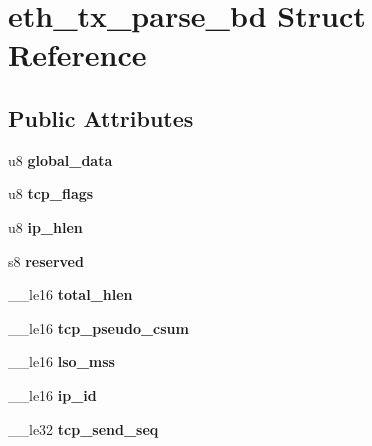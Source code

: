 \hypertarget{structeth__tx__parse__bd}{
\section{eth\_\-tx\_\-parse\_\-bd Struct Reference}
\label{structeth__tx__parse__bd}
}
\subsection*{Public Attributes}
\begin{DoxyCompactItemize}
\item 
\hypertarget{structeth__tx__parse__bd_a7b7f5aec557b3a6b45d133aa49247c58}{
u8 {\bfseries global\_\-data}}
\label{structeth__tx__parse__bd_a7b7f5aec557b3a6b45d133aa49247c58}

\item 
\hypertarget{structeth__tx__parse__bd_a49eeca34f84123dee757ce4af3e69185}{
u8 {\bfseries tcp\_\-flags}}
\label{structeth__tx__parse__bd_a49eeca34f84123dee757ce4af3e69185}

\item 
\hypertarget{structeth__tx__parse__bd_a1fdecb31e434f6a93b3314948f016467}{
u8 {\bfseries ip\_\-hlen}}
\label{structeth__tx__parse__bd_a1fdecb31e434f6a93b3314948f016467}

\item 
\hypertarget{structeth__tx__parse__bd_aa6d076ea08b403d8d1e6a0406af0a21e}{
s8 {\bfseries reserved}}
\label{structeth__tx__parse__bd_aa6d076ea08b403d8d1e6a0406af0a21e}

\item 
\hypertarget{structeth__tx__parse__bd_a98175b83474414440db4144e4e8891d8}{
\_\-\_\-le16 {\bfseries total\_\-hlen}}
\label{structeth__tx__parse__bd_a98175b83474414440db4144e4e8891d8}

\item 
\hypertarget{structeth__tx__parse__bd_a2c68709a81f9b7510f909a6b1b220f6b}{
\_\-\_\-le16 {\bfseries tcp\_\-pseudo\_\-csum}}
\label{structeth__tx__parse__bd_a2c68709a81f9b7510f909a6b1b220f6b}

\item 
\hypertarget{structeth__tx__parse__bd_a07609cfdce18c932b8ad96f3b3f6a7b9}{
\_\-\_\-le16 {\bfseries lso\_\-mss}}
\label{structeth__tx__parse__bd_a07609cfdce18c932b8ad96f3b3f6a7b9}

\item 
\hypertarget{structeth__tx__parse__bd_aeedf0a2f4eed95ee7e3c75482e8ddca7}{
\_\-\_\-le16 {\bfseries ip\_\-id}}
\label{structeth__tx__parse__bd_aeedf0a2f4eed95ee7e3c75482e8ddca7}

\item 
\hypertarget{structeth__tx__parse__bd_ab7fedccfbbe3745a16fc797baa485d96}{
\_\-\_\-le32 {\bfseries tcp\_\-send\_\-seq}}
\label{structeth__tx__parse__bd_ab7fedccfbbe3745a16fc797baa485d96}

\end{DoxyCompactItemize}


